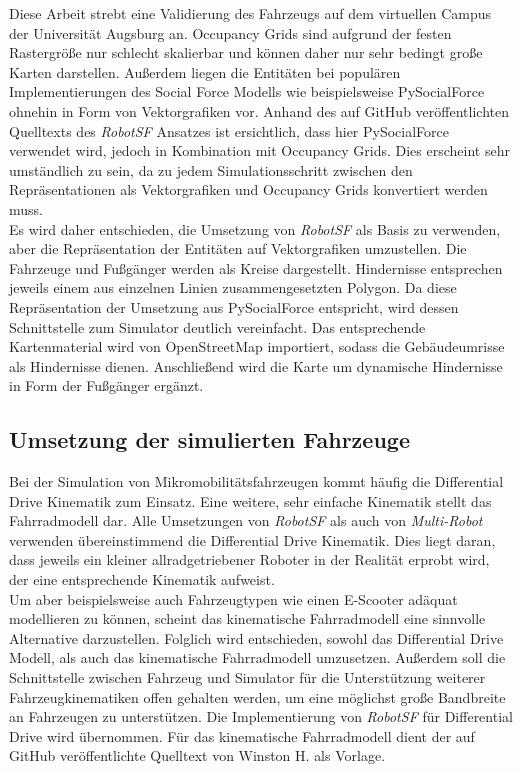 Diese Arbeit strebt eine Validierung des Fahrzeugs auf dem virtuellen Campus der Universität
Augsburg an. Occupancy Grids sind aufgrund der festen Rastergröße nur schlecht skalierbar
und können daher nur sehr bedingt große Karten darstellen. Außerdem liegen die Entitäten
bei populären Implementierungen des Social Force Modells wie beispielsweise PySocialForce
\cite{gao2020pysf} ohnehin in Form von Vektorgrafiken vor. Anhand des auf GitHub veröffentlichten
Quelltexts \cite{robotsf2022github} des \emph{RobotSF} Ansatzes ist ersichtlich,
dass hier PySocialForce verwendet wird, jedoch in Kombination mit Occupancy Grids.
Dies erscheint sehr umständlich zu sein, da zu jedem Simulationsschritt zwischen den
Repräsentationen als Vektorgrafiken und Occupancy Grids konvertiert werden muss.\\

Es wird daher entschieden, die Umsetzung von \emph{RobotSF} als Basis zu verwenden,
aber die Repräsentation der Entitäten auf Vektorgrafiken umzustellen. Die Fahrzeuge und
Fußgänger werden als Kreise dargestellt. Hindernisse entsprechen jeweils einem aus
einzelnen Linien zusammengesetzten Polygon. Da diese Repräsentation der Umsetzung aus
PySocialForce entspricht, wird dessen Schnittstelle zum Simulator deutlich vereinfacht.
Das entsprechende Kartenmaterial wird von OpenStreetMap importiert, sodass die Gebäudeumrisse
als Hindernisse dienen. Anschließend wird die Karte um dynamische Hindernisse in Form
der Fußgänger ergänzt.

\subsection{Umsetzung der simulierten Fahrzeuge}
Bei der Simulation von Mikromobilitätsfahrzeugen kommt häufig die Differential Drive
Kinematik zum Einsatz. Eine weitere, sehr einfache Kinematik stellt das Fahrradmodell dar.
Alle Umsetzungen von \emph{RobotSF} als auch von \emph{Multi-Robot} verwenden übereinstimmend
die Differential Drive Kinematik. Dies liegt daran, dass jeweils ein kleiner allradgetriebener
Roboter in der Realität erprobt wird, der eine entsprechende Kinematik aufweist.\\

Um aber beispielsweise auch Fahrzeugtypen wie einen E-Scooter adäquat modellieren zu können,
scheint das kinematische Fahrradmodell eine sinnvolle Alternative darzustellen. Folglich wird
entschieden, sowohl das Differential Drive Modell, als auch das kinematische Fahrradmodell umzusetzen.
Außerdem soll die Schnittstelle zwischen Fahrzeug und Simulator für die Unterstützung weiterer
Fahrzeugkinematiken offen gehalten werden, um eine möglichst große Bandbreite an Fahrzeugen
zu unterstützen. Die Implementierung von \emph{RobotSF} für Differential Drive wird übernommen.
Für das kinematische Fahrradmodell dient der auf GitHub veröffentlichte Quelltext von
Winston H. \cite{bicycle2023github} als Vorlage.

